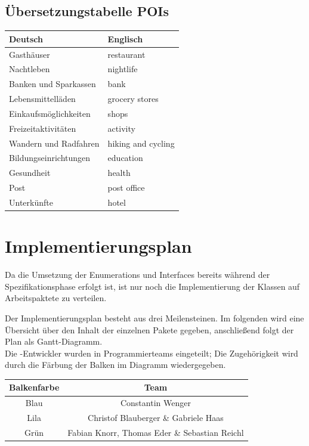 \documentclass[10pt]{scrreprt}
\newcommand{\JoglEarth}{\raisebox{-1.2mm}{\texttt{[image: Logo-Text.eps]}} }
\begin{document}
\section{Übersetzungstabelle POIs}
\begin{longtable}{|p{7.5cm}|p{7.5cm}|}
\hline 
\rule[-1ex]{0pt}{4ex} \textbf{Deutsch} & \textbf{Englisch} \\ 
\hline
\hline 
\rule[-1ex]{0pt}{4ex} Gasthäuser & restaurant \\ 
\hline
\rule[-1ex]{0pt}{4ex} Nachtleben & nightlife \\ 
\hline
\rule[-1ex]{0pt}{4ex} Banken und Sparkassen & bank \\ 
\hline
\rule[-1ex]{0pt}{4ex} Lebensmittelläden & grocery stores \\ 
\hline
\rule[-1ex]{0pt}{4ex} Einkaufsmöglichkeiten & shops \\ 
\hline
\rule[-1ex]{0pt}{4ex} Freizeitaktivitäten & activity \\ 
\hline
\rule[-1ex]{0pt}{4ex} Wandern und Radfahren & hiking and cycling \\
\hline
\rule[-1ex]{0pt}{4ex} Bildungseinrichtungen & education \\
\hline
\rule[-1ex]{0pt}{4ex} Gesundheit & health \\
\hline
\rule[-1ex]{0pt}{4ex} Post & post office \\ 
\hline
\rule[-1ex]{0pt}{4ex} Unterkünfte & hotel \\
\hline
\end{longtable}





\chapter{Implementierungsplan}

Da die Umsetzung der Enumerations und Interfaces bereits während der Spezifikationsphase erfolgt ist, ist nur noch die Implementierung der Klassen auf Arbeitspaktete zu verteilen.

Der Implementierungsplan besteht aus drei Meilensteinen. Im folgenden wird eine Übersicht über den Inhalt der einzelnen Pakete gegeben, anschließend folgt der Plan als Gantt-Diagramm.\\[3mm]
Die \JoglEarth -Entwickler wurden in Programmierteams eingeteilt; Die Zugehörigkeit wird durch die Färbung der Balken im Diagramm wiedergegeben.

\vspace{3mm}
\begin{center}
\begin{tabular}{|c|c|}
\hline
\rule[-1ex]{0pt}{4ex} \textbf{Balkenfarbe} & \textbf{Team} \\
\hline
\hline
\rule[-1ex]{0pt}{4ex} Blau & Constantin Wenger\\
\hline
\rule[-1ex]{0pt}{4ex} Lila & Christof Blauberger \& Gabriele Haas\\
\hline
\rule[-1ex]{0pt}{4ex} Grün & Fabian Knorr, Thomas Eder \& Sebastian Reichl\\
\hline
\end{tabular}
\end{center}
\end{document}
